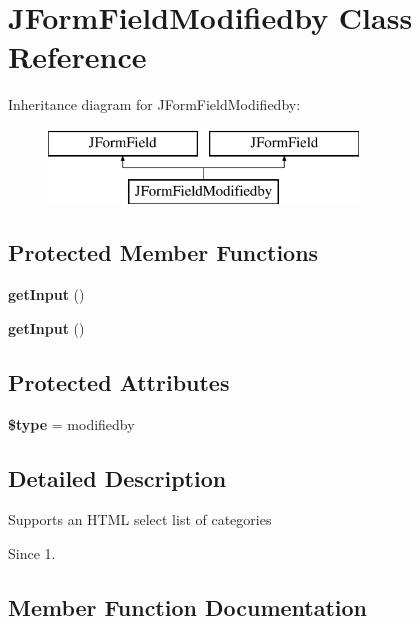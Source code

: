 \section{J\+Form\+Field\+Modifiedby Class Reference}
\label{class_j_form_field_modifiedby}
Inheritance diagram for J\+Form\+Field\+Modifiedby\+:\begin{figure}[H]
\begin{center}
\leavevmode
\includegraphics[height=2.000000cm]{class_j_form_field_modifiedby}
\end{center}
\end{figure}
\subsection*{Protected Member Functions}
\begin{DoxyCompactItemize}
\item 
\textbf{ get\+Input} ()
\item 
\textbf{ get\+Input} ()
\end{DoxyCompactItemize}
\subsection*{Protected Attributes}
\begin{DoxyCompactItemize}
\item 
\textbf{ \$type} = \textquotesingle{}modifiedby\textquotesingle{}
\end{DoxyCompactItemize}


\subsection{Detailed Description}
Supports an H\+T\+ML select list of categories

\begin{DoxySince}{Since}
1. 
\end{DoxySince}


\subsection{Member Function Documentation}
\mbox{\label{class_j_form_field_modifiedby_a4380f30ae9202fa49ebd2439572f9cdb}} 
